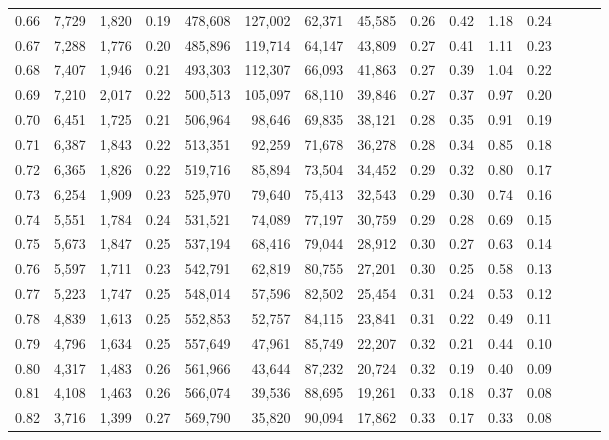 \begin{tabular}{rrrrrrrrrrrrrrr}
0.66 &   7,729 &  1,820 &  0.19 &  478,608 &  127,002 &   62,371 &   45,585 &  0.26 &  0.42 &  1.18 &      0.24 \\
0.67 &   7,288 &  1,776 &  0.20 &  485,896 &  119,714 &   64,147 &   43,809 &  0.27 &  0.41 &  1.11 &      0.23 \\
0.68 &   7,407 &  1,946 &  0.21 &  493,303 &  112,307 &   66,093 &   41,863 &  0.27 &  0.39 &  1.04 &      0.22 \\
0.69 &   7,210 &  2,017 &  0.22 &  500,513 &  105,097 &   68,110 &   39,846 &  0.27 &  0.37 &  0.97 &      0.20 \\
0.70 &   6,451 &  1,725 &  0.21 &  506,964 &   98,646 &   69,835 &   38,121 &  0.28 &  0.35 &  0.91 &      0.19 \\
0.71 &   6,387 &  1,843 &  0.22 &  513,351 &   92,259 &   71,678 &   36,278 &  0.28 &  0.34 &  0.85 &      0.18 \\
0.72 &   6,365 &  1,826 &  0.22 &  519,716 &   85,894 &   73,504 &   34,452 &  0.29 &  0.32 &  0.80 &      0.17 \\
0.73 &   6,254 &  1,909 &  0.23 &  525,970 &   79,640 &   75,413 &   32,543 &  0.29 &  0.30 &  0.74 &      0.16 \\
0.74 &   5,551 &  1,784 &  0.24 &  531,521 &   74,089 &   77,197 &   30,759 &  0.29 &  0.28 &  0.69 &      0.15 \\
0.75 &   5,673 &  1,847 &  0.25 &  537,194 &   68,416 &   79,044 &   28,912 &  0.30 &  0.27 &  0.63 &      0.14 \\
0.76 &   5,597 &  1,711 &  0.23 &  542,791 &   62,819 &   80,755 &   27,201 &  0.30 &  0.25 &  0.58 &      0.13 \\
0.77 &   5,223 &  1,747 &  0.25 &  548,014 &   57,596 &   82,502 &   25,454 &  0.31 &  0.24 &  0.53 &      0.12 \\
0.78 &   4,839 &  1,613 &  0.25 &  552,853 &   52,757 &   84,115 &   23,841 &  0.31 &  0.22 &  0.49 &      0.11 \\
0.79 &   4,796 &  1,634 &  0.25 &  557,649 &   47,961 &   85,749 &   22,207 &  0.32 &  0.21 &  0.44 &      0.10 \\
0.80 &   4,317 &  1,483 &  0.26 &  561,966 &   43,644 &   87,232 &   20,724 &  0.32 &  0.19 &  0.40 &      0.09 \\
0.81 &   4,108 &  1,463 &  0.26 &  566,074 &   39,536 &   88,695 &   19,261 &  0.33 &  0.18 &  0.37 &      0.08 \\
0.82 &   3,716 &  1,399 &  0.27 &  569,790 &   35,820 &   90,094 &   17,862 &  0.33 &  0.17 &  0.33 &      0.08 \\

\end{tabular}
